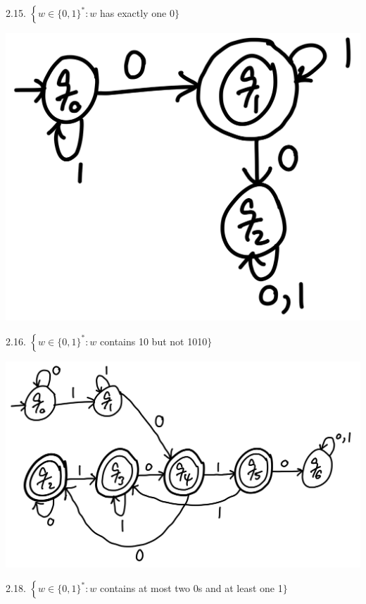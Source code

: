 \documentclass[10pt]{article}
\begin{document}
\begin{enumerate}[label={}]
            2.15. $\left\{w \in\{0,1\}^*: w\right.$ has exactly one 0$\}$


            \includegraphics[scale=0.2]{2.15}


            2.16. $\left\{w \in\{0,1\}^*: w\right.$ contains 10 but not 1010$\}$


            \includegraphics[scale=0.2]{2.16}


            2.18. $\left\{w \in\{0,1\}^*: w\right.$ contains at most two 0s and at least one 1$\}$



\end{enumerate}
\end{document}
